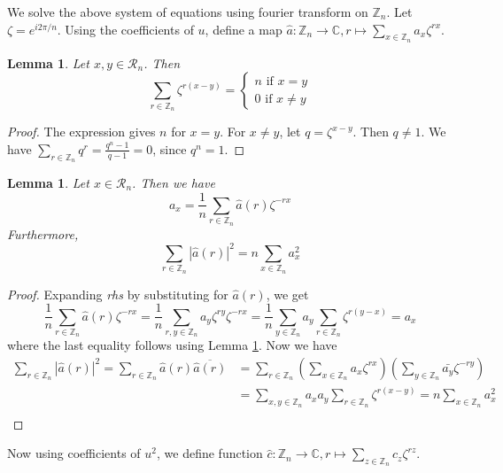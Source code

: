 \documentclass[10pt,twoside,reqno]{amsart}
\newtheorem{lemma}[theorem]{Lemma}
\theoremstyle{definition}
\numberwithin{equation}{section}
\begin{document}
We solve the above system of equations using fourier transform on $\mathbb Z_n$. Let $\zeta=e^{i2\pi/n}$. Using the coefficients of $u$, define a map $\hat{a}: \mathbb Z_n \rightarrow \mathbb C, r \mapsto \sum\limits_{x\in \mathbb Z_n}a_x \zeta^{rx}$.

\begin{lemma} \label{ortho}
Let $x,y\in \mathcal R_n$. Then
\[ \sum\limits_{r\in \mathbb Z_n}\zeta^{r(x-y)}=\begin{cases}
    n \text{ if } x=y\\
    0 \text{ if } x\neq y
\end{cases} \]
\end{lemma}
\begin{proof}
The expression gives $n$ for $x=y$. For $x\neq y$, let $q=\zeta^{x-y}$. Then $q\neq 1$. We have $\sum\limits_{r\in \mathbb Z_n}q^r = \frac{q^n-1}{q-1}=0$, since $q^n=1$. 
\end{proof}

\begin{lemma}\label{inv}
Let $x\in \mathcal R_n$. Then we have
\[a_x= \frac{1}{n} \sum\limits_{r\in \mathbb Z_n} \hat{a}(r)\zeta^{-rx}\]
Furthermore,
\[ \sum\limits_{r\in \mathbb Z_n} |\hat{a}(r)|^2=n \sum\limits_{x\in \mathbb Z_n} a_x^2 \]
\end{lemma}

\begin{proof}
Expanding \textit{rhs} by substituting for $\hat{a}(r)$, we get
\[\frac{1}{n} \sum\limits_{r\in \mathbb Z_n} \hat{a}(r)\zeta^{-rx}= \frac{1}{n}\sum\limits_{r,y\in \mathbb Z_n}a_y\zeta^{ry}\zeta^{-rx}=\frac{1}{n}\sum\limits_{y\in \mathbb Z_n}a_y \sum\limits_{r\in \mathbb Z_n}\zeta^{r(y-x)}=a_x\]
where the last equality follows using Lemma \ref{ortho}.
Now we have 
\begin{align*}
\sum\limits_{r\in \mathbb Z_n} |\hat{a}(r)|^2= \sum\limits_{r\in \mathbb Z_n} \hat{a}(r)\overline{\hat{a}(r)}&= \sum\limits_{r\in \mathbb Z_n} \left( \sum\limits_{x\in \mathbb Z_n}a_x\zeta^{rx}  \right) \left( \sum\limits_{y\in \mathbb Z_n} \bar{a_y} \zeta^{-ry} \right)\\
&= \sum\limits_{x,y\in \mathbb Z_n}a_xa_y \sum\limits_{r\in \mathbb Z_n}\zeta^{r(x-y)}= n\sum\limits_{x\in \mathbb Z_n} a_x^2\\
\end{align*}
\end{proof}


Now using coefficients of $u^2$, we define function $\hat{c}: \mathbb Z_n \rightarrow \mathbb C, r \mapsto \sum\limits_{z\in \mathbb Z_n}c_z\zeta^{rz}$. 
\end{document}
